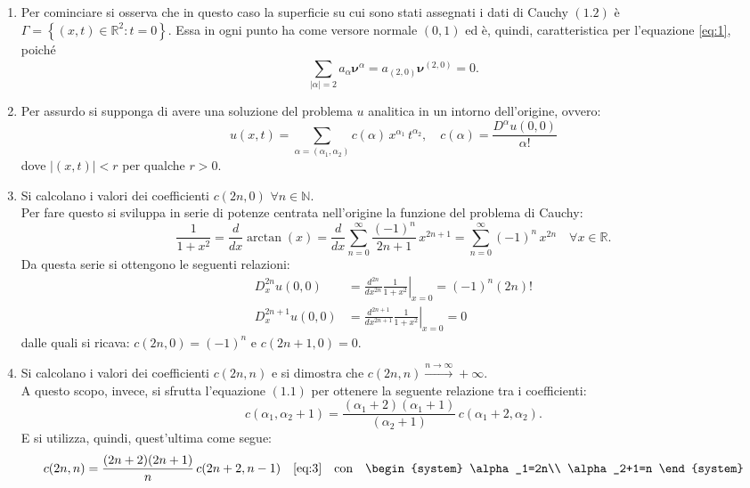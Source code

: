 \begin{enumerate}
\item
Per cominciare si osserva che in questo caso la superficie su cui sono stati assegnati i dati di Cauchy $(1.2)$ è 
$\Gamma=\left\lbrace(x,t) \in \mathbb{R}^2:t=0\right\rbrace$. Essa in ogni punto ha come versore normale $(0,1)$ ed è, quindi,
caratteristica per l'equazione \eqref{eq:1}, poiché
$$\sum_{|\alpha|=2}^{\;} a_\alpha \boldsymbol{\nu}^\alpha = a_{(2,0)}\boldsymbol{\nu}^{(2,0)} = 0.$$
\item
Per assurdo si supponga di avere una soluzione del problema $u$ analitica in un intorno dell'origine, ovvero:
$$u(x,t) = \sum_{\alpha = (\alpha_1, \alpha_2) }^{\;} c(\alpha) \, x^{\alpha_1} \, t ^{\alpha_2}, \quad
 c(\alpha) = \frac{D^\alpha u(0,0)}{\alpha!}$$
dove $|(x,t)|<r$ per qualche $r>0$.
\item
Si calcolano i valori dei coefficienti $c(2n,0)$ $\forall n \in \mathbb{N}$.\\
Per fare questo si sviluppa in serie di potenze centrata nell'origine la funzione del problema di Cauchy:
$$\frac{1}{1+x^2} = \frac{d}{dx}\arctan(x) = \frac{d}{dx}\sum_{n=0}^{\infty}\frac{(-1)^n}{2n+1} \, x^{2n+1} 
= \sum_{n=0}^{\infty}(-1)^n \, x^{2n} \quad \forall x \in \mathbb{R}.$$
Da questa serie si ottengono le seguenti relazioni:
\begin{align*}
D_x^{2n}u(0,0) &= \frac{d^{2n}}{dx^{2n}} \left. \frac{1}{1+x^2}\right|_{x=0} = (-1)^n (2n)!\\
D_x^{2n+1}u(0,0) &= \frac{d^{2n+1}}{dx^{2n+1}} \left. \frac{1}{1+x^2} \right|_{x=0} = 0
\end{align*} 
dalle quali si ricava: $c(2n,0)=(-1)^n$ e $c(2n+1,0)=0$.
\item
Si calcolano i valori dei coefficienti $c(2n,n)$ e si dimostra che  $c(2n,n) \xrightarrow{n\rightarrow\infty} +\infty$.\\
A questo scopo, invece, si sfrutta l'equazione $(1.1)$ per ottenere la seguente relazione tra i coefficienti:
\begin{equation} 
\label{eq:3}
c(\alpha_1,\alpha_2+1) = \frac{(\alpha_1+2)(\alpha_1+1)}{(\alpha_2+1)} \, c(\alpha_1+2,\alpha_2).
\end{equation}
E si utilizza, quindi, quest'ultima come segue:
\begin{align*}
c(2n,n) &= \frac{(2n+2)(2n+1)}{n} \, c(2n+2,n-1)   &\eqref{eq:3}\quad\text{con} \quad 
\begin{system}
\alpha_1=2n\\
\alpha_2+1=n
\end{system}\\

\end{align*}
\end{enumerate}
